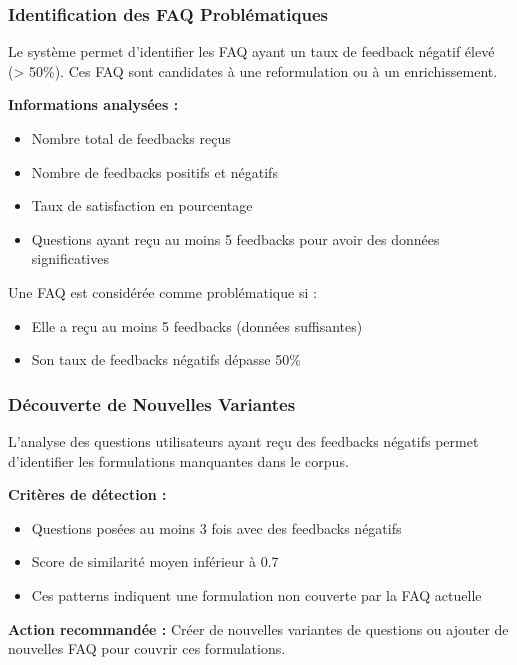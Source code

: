 \documentclass[11pt,a4paper]{article}
\begin{document}
\subsubsection{Identification des FAQ Problématiques}

Le système permet d'identifier les FAQ ayant un taux de feedback négatif élevé (> 50\%). Ces FAQ sont candidates à une reformulation ou à un enrichissement.

\textbf{Informations analysées :}
\begin{itemize}
    \item Nombre total de feedbacks reçus
    \item Nombre de feedbacks positifs et négatifs
    \item Taux de satisfaction en pourcentage
    \item Questions ayant reçu au moins 5 feedbacks pour avoir des données significatives
\end{itemize}

\begin{astuce}
Une FAQ est considérée comme problématique si :
\begin{itemize}
    \item Elle a reçu au moins 5 feedbacks (données suffisantes)
    \item Son taux de feedbacks négatifs dépasse 50\%
\end{itemize}
\end{astuce}

\subsubsection{Découverte de Nouvelles Variantes}

L'analyse des questions utilisateurs ayant reçu des feedbacks négatifs permet d'identifier les formulations manquantes dans le corpus.

\textbf{Critères de détection :}
\begin{itemize}
    \item Questions posées au moins 3 fois avec des feedbacks négatifs
    \item Score de similarité moyen inférieur à 0.7
    \item Ces patterns indiquent une formulation non couverte par la FAQ actuelle
\end{itemize}

\textbf{Action recommandée :} Créer de nouvelles variantes de questions ou ajouter de nouvelles FAQ pour couvrir ces formulations.
\end{document}
